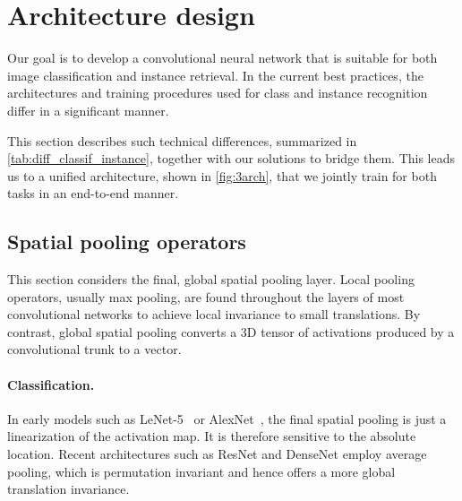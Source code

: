 %
\section{Architecture design}\label{sec:arch}
%
Our goal is to develop a convolutional neural network that is suitable for both image classification and instance retrieval.
%
%
%
In the current best practices, the architectures and training procedures used for class and instance recognition differ in a significant manner.
%

This section describes such technical differences, summarized in \cref{tab:diff_classif_instance}, together with our solutions to bridge them. 
This leads us to a unified architecture, shown in \cref{fig:3arch}, that we jointly train for both tasks in an end-to-end manner.


\begin{table}
\centering
\caption{\label{tab:diff_classif_instance}
Differences between classification and image retrieval:
Retrieval architectures incorporate a final pooling layer that is regionalized (RMAC) or magnifies activations (GeM). The triplet loss requires a batching strategy with pairs of matching images. %
%
}
\vspace{-7pt}

\vspace{-7pt}
\end{table}




\subsection{Spatial pooling operators\label{sec:p-pooling}}
%
%
%
%
%
%
%
%
%
%
%
This section considers the final, global spatial pooling layer.
%
Local pooling operators, usually max pooling, are found throughout the layers of most convolutional networks to achieve local invariance to small translations. 
By contrast, global spatial pooling converts a 3D tensor of activations produced by a convolutional trunk to a vector. 
%

\paragraph{Classification.}  
In early models such as LeNet-5~\cite{lecun1989backpropagation} or AlexNet~\cite{krizhevsky2012imagenet}, the final spatial pooling is just a linearization of the activation map.
It is therefore sensitive to the absolute location. 
Recent architectures such as ResNet and DenseNet employ average pooling, which is permutation invariant and hence offers a more global translation invariance. 
%
%
%

